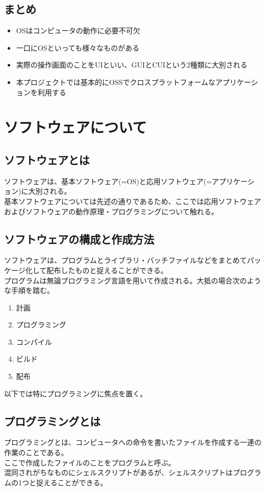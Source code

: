 \documentclass{ltjsarticle}
\begin{document}
\subsection{まとめ}
\begin{itemize}
    \item OSはコンピュータの動作に必要不可欠
    \item 一口にOSといっても様々なものがある
    \item 実際の操作画面のことをUIといい、GUIとCUIという2種類に大別される
    \item 本プロジェクトでは基本的にOSSでクロスプラットフォームなアプリケーションを利用する
\end{itemize}
\section{ソフトウェアについて}
\subsection{ソフトウェアとは}
ソフトウェアは、基本ソフトウェア(=OS)と応用ソフトウェア(=アプリケーション)に大別される。\\
基本ソフトウェアについては先述の通りであるため、ここでは応用ソフトウェアおよびソフトウェアの動作原理・プログラミングについて触れる。
\subsection{ソフトウェアの構成と作成方法}
ソフトウェアは、プログラムとライブラリ・バッチファイルなどをまとめてパッケージ化して配布したものと捉えることができる。\\
プログラムは無論プログラミング言語を用いて作成される。大抵の場合次のような手順を踏む。
\begin{enumerate}
    \item 計画
    \item プログラミング
    \item コンパイル
    \item ビルド
    \item 配布
\end{enumerate}
以下では特にプログラミングに焦点を置く。
\subsection{プログラミングとは}
プログラミングとは、コンピュータへの命令を書いたファイルを作成する一連の作業のことである。\\
ここで作成したファイルのことをプログラムと呼ぶ。\\
混同されがちなものにシェルスクリプトがあるが、シェルスクリプトはプログラムの1つと捉えることができる。
\end{document}
